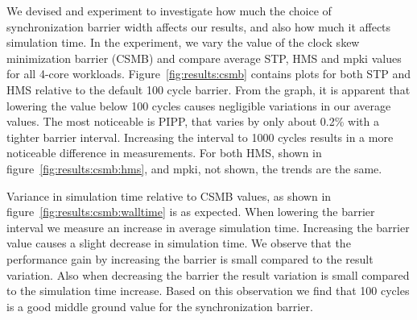 We devised and experiment to investigate how much the choice of synchronization barrier width affects our results, and also how much it affects simulation time.
In the experiment, we vary the value of the clock skew minimization barrier (CSMB) and compare average STP, HMS and mpki values for all 4-core workloads.
Figure~\ref{fig:results:csmb} contains plots for both STP and HMS relative to the default 100 cycle barrier.
From the graph, it is apparent that lowering the value below 100 cycles causes negligible variations in our average values. 
The most noticeable is PIPP, that varies by only about 0.2\% with a tighter barrier interval.
Increasing the interval to 1000 cycles results in a more noticeable difference in measurements.
For both HMS, shown in figure~\ref{fig:results:csmb:hms}, and mpki, not shown, the trends are the same.

Variance in simulation time relative to CSMB values, as shown in figure~\ref{fig:results:csmb:walltime} is as expected. 
When lowering the barrier interval we measure an increase in average simulation time.
Increasing the barrier value causes a slight decrease in simulation time.
We observe that the performance gain by increasing the barrier is small compared to the result variation. 
Also when decreasing the barrier the result variation is small compared to the simulation time increase.
Based on this observation we find that 100 cycles is a good middle ground value for the synchronization barrier.

